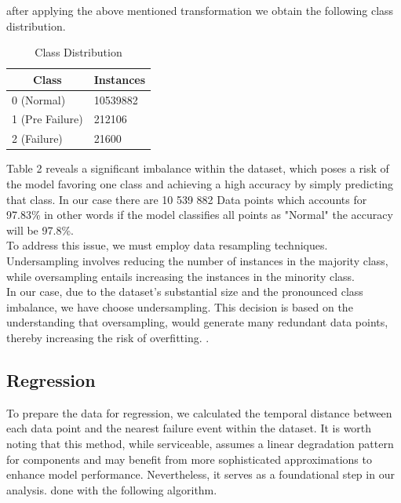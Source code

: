 \documentclass{article}
\begin{document}
after applying the above mentioned transformation we obtain the following class distribution. \\

\begin{table}[htbp]
\centering
\caption{Class Distribution}
\begin{tabular}{|l|l|}
\hline
\multicolumn{1}{|c|}{\textbf{Class}} & \multicolumn{1}{c|}{\textbf{Instances}} \\ \hline
0 (Normal)                           & 10539882                                \\ \hline
1 (Pre Failure)                      & 212106                                  \\ \hline
2 (Failure)                          & 21600                                   \\ \hline
\end{tabular}
\end{table}

Table 2 reveals a significant imbalance within the dataset, which poses a risk of the model favoring one class and achieving a high accuracy by simply predicting that class. In our case there are 10 539 882 Data points which accounts for 97.83\% in other words if the model classifies all points as "Normal" the accuracy will be 97.8\%. \\

To address this issue, we must employ data resampling techniques. Undersampling involves reducing the number of instances in the majority class, while oversampling entails increasing the instances in the minority class. \\

In our case, due to the dataset's substantial size and the pronounced class imbalance, we have choose undersampling. This decision is based on the understanding that oversampling, would generate many redundant data points, thereby increasing the risk of overfitting. \cite{ELLIS2023}.

\subsection{Regression} 
    
To prepare the data for regression, we calculated the temporal distance between each data point and the nearest failure event within the dataset. It is worth noting that this method, while serviceable, assumes a linear degradation pattern for components and may benefit from more sophisticated approximations to enhance model performance. Nevertheless, it serves as a foundational step in our analysis. done with the following algorithm.
\end{document}
